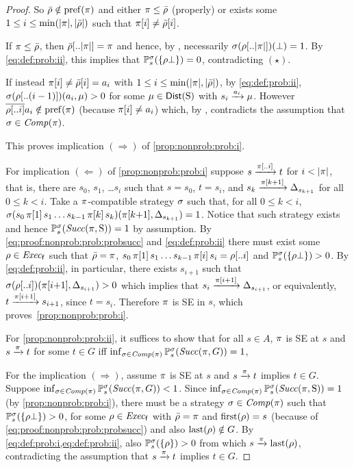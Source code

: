\begin{proof}
  So $\bar{\rho}\notin\mathrm{pref}(\pi)$ and either $\pi\leq\bar{\rho}$
  (properly) or exists some $1\leq i \leq\min({|}{\pi}{|},{|}{\bar{\rho}}{|})$
  such that $\pi[i]\neq\bar{\rho}[i]$.

  If $\pi\leq\bar{\rho}$, then $\bar{\rho}[..{|}{\pi}{|}]=\pi$ and
  hence, by , necessarily
  $\sigma(\rho[..{|}{\pi}{|}])(\bot) = 1$.  By \cref{eq:def:prob:ii},
  this implies that $\mathbb{P}^\sigma_s(\{\rho\bot\})=0$,
  contradicting $(\star)$.

  If instead $\pi[i]\neq\bar{\rho}[i]=a_i$ with
  $1\leq i \leq\min({|}{\pi}{|},{|}{\bar{\rho}}{|})$, by \cref{eq:def:prob:ii},
  $\sigma(\rho[..(i-1)])(a_i,\mu) > 0$ for some
  $\mu\in\mathsf{Dist}(\operatorname{S})$ with $s_i\xrightarrow{a_i}\mu$.
  However $\overline{\rho[..i]}a_i \notin \mathrm{pref}(\pi)$
  (because $\pi[i]\neq a_i$) which, by
  , contradicts the assumption that
  $\sigma\in\mathit{Comp}(\pi)$.

  This proves implication $(\Rightarrow)$ of \cref{prop:nonprob:prob:i}.

  For implication $(\Leftarrow)$ of \cref{prop:nonprob:prob:i} suppose
  $s\xrightarrow{\pi[..i]}t$ for $i<{|}{\pi}{|}$, that is, there are $s_0$,
  $s_1$, \ldots $s_i$ such that $s=s_0$, $t=s_i$, and
  $s_k\xrightarrow{\pi[k{+}1]}\Delta_{s_{k{+}1}}$ for all $0\leq k < i$.
  Take a $\pi$-compatible strategy $\sigma$ such that, for all
  $0\leq k < i$,
  $\sigma(s_0\,\pi[1]\,s_1\ldots s_{k{-}1}\,\pi[k]\,s_k)(\pi[k{+}1],\Delta_{s_{k{+}1}})=1$.
  Notice that such strategy exists and hence
  $\mathbb{P}^\sigma_s(\mathit{Succ}(\pi,\operatorname{S}))=1$ by assumption.
  By \cref{eq:proof:nonprob:prob:probsucc} and \cref{eq:def:prob:ii}
  there must exist some $\rho\in\mathit{Exec}_{\mathsf{f}}$ such that $\bar{\rho}=\pi$,
  $s_0\,\pi[1]\,s_1\ldots s_{k{-}1}\,\pi[i]\,s_i = \rho[..i]$ and
  $\mathbb{P}^\sigma_s(\{\rho\bot\})>0$.  By \cref{eq:def:prob:ii}, in
  particular, there exists $s_{i{+}1}$ such that
  $\sigma(\rho[..i])(\pi[i{+}1],\Delta_{s_{i{+}1}})> 0$ which
  implies that $s_i\xrightarrow{\pi[i{+}1]}\Delta_{s_{i{+}1}}$, or
  equivalently, $t\xrightarrow{\pi[i{+}1]}s_{i{+}1}$, since $t=s_i$.
  Therefore $\pi$ is SE in $s$, which proves~\cref{prop:nonprob:prob:i}.

  For \cref{prop:nonprob:prob:ii}, it suffices to show that for all
  $s\in A$, $\pi$ is SE at $s$ and $s \xrightarrow{\pi} t$ for some
  $t\in G$ iff
  $\inf_{\sigma\in\mathit{Comp}(\pi)}\mathbb{P}^\sigma_s(\mathit{Succ}(\pi,G))=1$,

  For the implication $(\Rightarrow)$, assume $\pi$ is SE at $s$ and
  $s \xrightarrow{\pi} t$ implies $t\in G$.
  Suppose
  $\inf_{\sigma\in\mathit{Comp}(\pi)}\mathbb{P}^\sigma_s(\mathit{Succ}(\pi,G))<1$.
  Since
  $\inf_{\sigma\in\mathit{Comp}(\pi)}\mathbb{P}^\sigma_s(\mathit{Succ}(\pi,\operatorname{S}))=1$ (by
  \cref{prop:nonprob:prob:i}), there must be a strategy
  $\sigma\in\mathit{Comp}(\pi)$ such that
  $\mathbb{P}^\sigma_s(\{\rho\bot\})>0$, for some $\rho\in\mathit{Exec}_{\mathsf{f}}$ with
  $\bar{\rho}=\pi$ and $\mathrm{first}(\rho)=s$ (because of
  \cref{eq:proof:nonprob:prob:probsucc}) and also $\mathrm{last}(\rho)\notin G$.
  By \cref{eq:def:prob:i,eq:def:prob:ii}, also
  $\mathbb{P}^\sigma_s(\{\rho\})>0$ from which $s\xrightarrow{\pi}\mathrm{last}(\rho)$,
  contradicting the assumption that $s \xrightarrow{\pi} t$ implies
  $t\in G$.


\end{proof}
